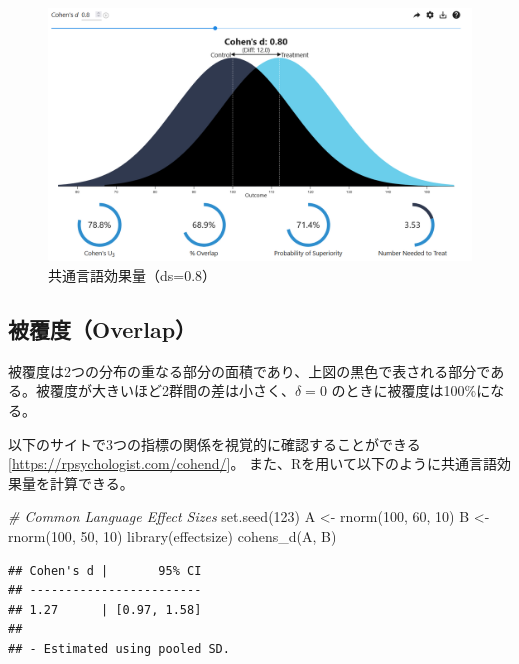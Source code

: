 \documentclass[
  ja=standard, xelatex, base=12pt]{bxjsreport}
\newenvironment{Shaded}{\begin{snugshade}}{\end{snugshade}}
\newcommand{\CommentTok}[1]{\textcolor[rgb]{0.56,0.35,0.01}{\textit{#1}}}
\newcommand{\DecValTok}[1]{\textcolor[rgb]{0.00,0.00,0.81}{#1}}
\newcommand{\FunctionTok}[1]{\textcolor[rgb]{0.00,0.00,0.00}{#1}}
\newcommand{\NormalTok}[1]{#1}
\newcommand{\OtherTok}[1]{\textcolor[rgb]{0.56,0.35,0.01}{#1}}
\begin{document}
\begin{figure}
\centering
\includegraphics{images/commonl.png}
\caption{共通言語効果量（ds=0.8）}
\end{figure}

\hypertarget{ux88abux8986ux5ea6overlap}{%
\subsection{被覆度（Overlap）}\label{ux88abux8986ux5ea6overlap}}

被覆度は2つの分布の重なる部分の面積であり、上図の黒色で表される部分である。被覆度が大きいほど2群間の差は小さく、\(\delta=0\) のときに被覆度は100\%になる。

以下のサイトで3つの指標の関係を視覚的に確認することができる{[}\url{https://rpsychologist.com/cohend/}{]}。 また、Rを用いて以下のように共通言語効果量を計算できる。

\begin{Shaded}
\begin{Highlighting}[]
\CommentTok{\# Common Language Effect Sizes}
\FunctionTok{set.seed}\NormalTok{(}\DecValTok{123}\NormalTok{)}
\NormalTok{A }\OtherTok{\textless{}{-}} \FunctionTok{rnorm}\NormalTok{(}\DecValTok{100}\NormalTok{, }\DecValTok{60}\NormalTok{, }\DecValTok{10}\NormalTok{)}
\NormalTok{B }\OtherTok{\textless{}{-}} \FunctionTok{rnorm}\NormalTok{(}\DecValTok{100}\NormalTok{, }\DecValTok{50}\NormalTok{, }\DecValTok{10}\NormalTok{)}
\FunctionTok{library}\NormalTok{(effectsize)}
\FunctionTok{cohens\_d}\NormalTok{(A, B)}
\end{Highlighting}
\end{Shaded}

\begin{verbatim}
## Cohen's d |       95% CI
## ------------------------
## 1.27      | [0.97, 1.58]
## 
## - Estimated using pooled SD.
\end{verbatim}
\end{document}
